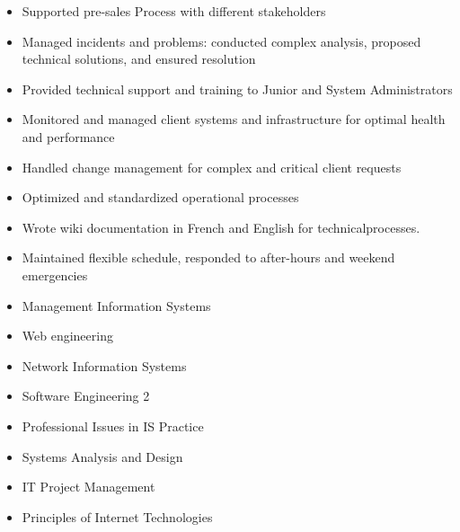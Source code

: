 \documentclass[10pt,a4paper,ragged2e,withhyper]{altacv}
\begin{document}
\begin{paracol}{2}
\divider

\begin{itemize}
\item Supported pre-sales Process with different stakeholders
\item Managed incidents and problems: conducted complex analysis, proposed technical solutions, and ensured resolution
\item Provided technical support and training to Junior and System Administrators
\item Monitored and managed client systems and infrastructure for optimal health and performance
\item Handled change management for complex and critical client requests
\item Optimized and standardized operational processes
\item Wrote wiki documentation in French and English for technicalprocesses.
\item Maintained flexible schedule, responded to after-hours and weekend emergencies
\end{itemize}

\switchcolumn


\begin{itemize}[label=\textcolor{DarkPastelRed}{$\triangleright$}]
\item Management Information Systems
\item Web engineering
\item Network Information Systems
\item Software Engineering 2
\end{itemize}

\divider

\begin{itemize}[label=\textcolor{DarkPastelRed}{$\triangleright$}]
\item Professional Issues in IS Practice
\item Systems Analysis and Design
\item IT Project Management
\item Principles of Internet Technologies
\end{itemize}

\divider


\end{paracol}
\end{document}
